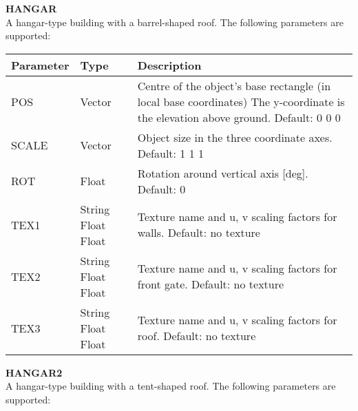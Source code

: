 \documentclass[Orbiter Developer Manual.tex]{subfiles}
\begin{document}
\noindent
\textbf{HANGAR}\\
A hangar-type building with a barrel-shaped roof. The following parameters are supported:

	\begin{longtable}{ |p{}|p{}|p{}| }
	\hline\rule{0pt}{2ex}
	\textbf{Parameter} & \textbf{Type} & \textbf{Description}\\
	\hline\rule{0pt}{2ex}
	POS & Vector & Centre of the object’s base rectangle (in local base coordinates) The y-coordinate is the elevation above ground. Default: 0 0 0\\
	\hline\rule{0pt}{2ex}
	SCALE & Vector & Object size in the three coordinate axes. Default: 1 1 1\\
	\hline\rule{0pt}{2ex}
	ROT & Float & Rotation around vertical axis [deg]. Default: 0\\
	\hline\rule{0pt}{2ex}
	TEX1 & String Float Float & Texture name and u, v scaling factors for walls. Default: no texture\\
	\hline\rule{0pt}{2ex}
	TEX2 & String Float Float & Texture name and u, v scaling factors for front gate. Default: no texture\\
	\hline\rule{0pt}{2ex}
	TEX3 & String Float Float & Texture name and u, v scaling factors for roof. Default: no texture\\
	\hline
	\end{longtable}

\noindent
\textbf{HANGAR2}\\
A hangar-type building with a tent-shaped roof. The following parameters are supported:
\end{document}
